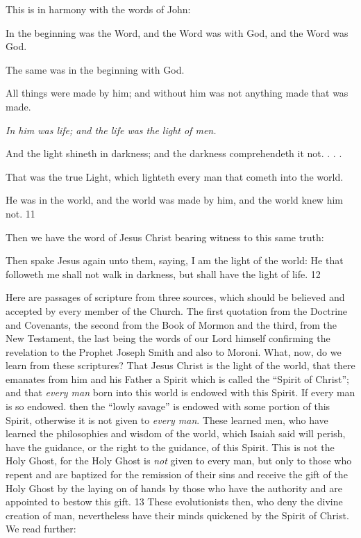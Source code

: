 This is in harmony with the words of John:

In the beginning was the Word, and the Word was with God, and the Word was God.

The same was in the beginning with God.

All things were made by him; and without him was not anything made that was made.

\textit{In him was life; and the life was the light of men.}

And the light shineth in darkness; and the darkness comprehendeth it not. . . .

That was the true Light, which lighteth every man that cometh into the world.

He was in the world, and the world was made by him, and the world knew him not. 11

Then we have the word of Jesus Christ bearing witness to this same truth:

Then spake Jesus again unto them, saying, I am the light of the world: He that followeth me
shall not walk in darkness, but shall have the light of life. 12

Here are passages of scripture from three sources, which should be believed and accepted by
every member of the Church. The first quotation from the Doctrine and Covenants, the
second from the Book of Mormon and the third, from the New Testament, the last being the
words of our Lord himself confirming the revelation to the Prophet Joseph Smith and also to
Moroni. What, now, do we learn from these scriptures? That Jesus Christ is the light of the
world, that there emanates from him and his Father a Spirit which is called the ``Spirit of
Christ''; and that \textit{every man} born into this world is endowed with this Spirit. If every man is
so endowed. then the ``lowly savage'' is endowed with some portion of this Spirit, otherwise
it is not given to \textit{every man}. These learned men, who have learned the philosophies and
wisdom of the world, which Isaiah said will perish, have the guidance, or the right to the
guidance, of this Spirit. This is not the Holy Ghost, for the Holy Ghost is \textit{not} given to every
man, but only to those who repent and are baptized for the remission of their sins and receive
the gift of the Holy Ghost by the laying on of hands by those who have the authority and are
appointed to bestow this gift. 13 These evolutionists then, who deny the divine creation of
man, nevertheless have their minds quickened by the Spirit of Christ. We read further:

